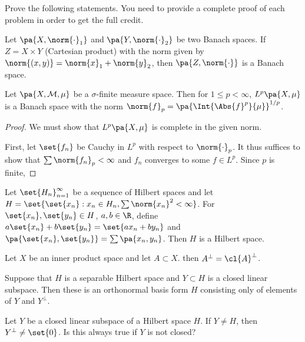 \documentclass[12pt,letterpaper,twoside]{hmcpset}
\begin{document}
\noindent Prove the following statements.  You need to provide a complete proof of each problem in order to get the full credit.

\begin{problem}[1][10]
 Let $\pa{X,\norm{\cdot}_1}$ and $\pa{Y,\norm{\cdot}_2}$ be two Banach spaces. If $Z = X \times Y$ (Cartesian product) with the norm given by $\norm{(x,y)} = \norm{x}_1 + \norm{y}_2$, then $\pa{Z,\norm{\cdot}}$ is a Banach space.
\end{problem}

\begin{problem}[2][10]
 Let $\pa{X, \mathcal{M}, \mu}$ be a $\sigma$-finite measure space.  Then for $1 \leq p < \infty$, $L^p\pa{X,\mu}$ is a Banach space with the norm $\norm{f}_p = \pa{\Int{\Abs{f}^p}{\mu}}^{1/p}$.
\end{problem}

\begin{solution}
 \begin{proof}
  We must show that $L^p\pa{X,\mu}$ is complete in the given norm.
  
  First, let $\set{f_n}$ be Cauchy in $L^p$ with respect to $\norm{\cdot}_p$. It thus suffices to show that $\sum{\norm{f_n}_p} < \infty$ and $f_n$ converges to some $f \in L^p$. Since $p$ is finite, 
 \end{proof}
\end{solution}


\begin{problem}[3][20]
 Let $\set{H_n}_{n=1}^\infty$ be a sequence of Hilbert spaces and let $H = \set{\set{x_n} : x_n \in H_n, \sum\norm{x_n}^2 < \infty}$. For $\set{x_n},\set{y_n} \in H$, $a,b \in \R$, define $a\set{x_n} + b\set{y_n} = \set{ax_n + by_n}$ and $\pa{\set{x_n},\set{y_n}} = \sum\pa{x_n,y_n}$. Then $H$ is a Hilbert space.
\end{problem}

\begin{problem}[4][10]
 Let $X$ be an inner product space and let $A \subset X$. then $A^\perp = \cl{A}^\perp$.
\end{problem}

\begin{problem}[5][10]
 Suppose that $H$ is a separable Hilbert space and $Y \subset H$ is a closed linear subspace. Then these is an orthonormal basis form $H$ consisting only of elements of $Y$ and $Y^\perp$.
\end{problem}

\begin{problem}[6][15]
 Let $Y$ be a closed linear subspace of a Hilbert space $H$. If $Y \neq H$, then $Y^\perp \neq \set{0}$. Is this always true if $Y$ is not closed?
\end{problem}
\end{document}
